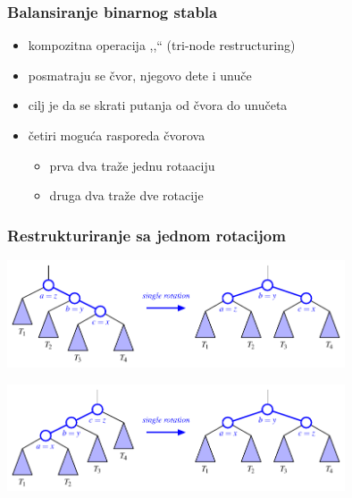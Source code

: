 \documentclass[compress,aspectratio=169]{beamer}
\begin{document}
\begin{frame}[fragile]
  \frametitle{Balansiranje binarnog stabla}
  \begin{itemize}
    \item kompozitna operacija ,,`` (tri-node restructuring)
    \item posmatraju se čvor, njegovo dete i unuče
    \item cilj je da se skrati putanja od čvora do unučeta
    \item četiri moguća rasporeda čvorova
    \begin{itemize}
      \item prva dva traže jednu rotaaciju
      \item druga dva traže dve rotacije
    \end{itemize}
  \end{itemize}
\end{frame}

\begin{frame}[fragile]
  \frametitle{Restrukturiranje sa jednom rotacijom}
  \begin{center}
    \includegraphics[width=10cm]{asp-11-pic10.pdf}
  \end{center}
  \begin{center}
    \includegraphics[width=10cm]{asp-11-pic11.pdf}
  \end{center}
\end{frame}
\end{document}
